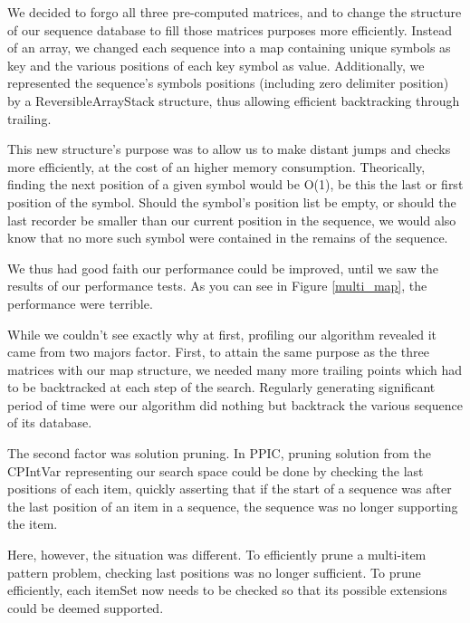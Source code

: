 \documentclass{eplmastersthesis}
\begin{document}
We decided to forgo all three pre-computed matrices, and to change the structure of our sequence database to fill those matrices purposes more efficiently. Instead of an array, we changed each sequence into a map containing unique symbols as key and the various positions of each key symbol as value. 
Additionally, we represented the sequence's symbols positions (including zero delimiter position) by a ReversibleArrayStack structure, thus allowing efficient backtracking through trailing. \newline

This new structure's purpose was to allow us to make distant jumps and checks more efficiently, at the cost of an higher memory consumption. Theorically, finding the next position of a given symbol would be O(1), be this the last or first position of the symbol. Should the symbol's position list be empty, or should the last recorder be smaller than our current position in the sequence, we would also know that no more such symbol were contained in the remains of the sequence. \newline

We thus had good faith our performance could be improved, until we saw the results of our performance tests. As you can see in Figure \ref{multi_map}, the performance were terrible. \newline

While we couldn't see exactly why at first, profiling our algorithm revealed it came from two majors factor. First, to attain the same purpose as the three matrices with our map structure, we needed many more trailing points which had to be backtracked at each step of the search. Regularly generating significant period of time were our algorithm did nothing but backtrack the various sequence of its database. \newline

The second factor was solution pruning. In PPIC, pruning solution from the CPIntVar representing our search space could be done by checking the last positions of each item, quickly asserting that if the start of a sequence was after the last position of an item in a sequence, the sequence was no longer supporting the item. \newline

Here, however, the situation was different. To efficiently prune a multi-item pattern problem, checking last positions was no longer sufficient. To prune efficiently, each itemSet now needs to be checked so that its possible extensions could be deemed supported.
\end{document}
